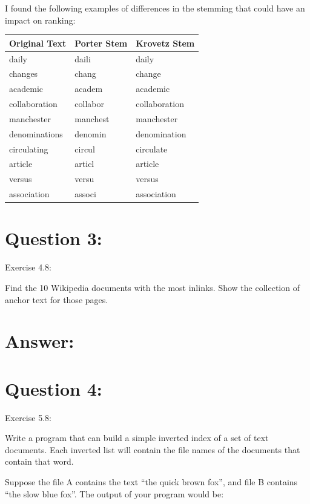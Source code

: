 \documentclass[a4paper, 11pt]{article}
\begin{document}
\pagebreak

I found the following examples of differences in the stemming that could have an impact on ranking:

\begin{longtable}{ |p{3cm}|p{3cm}|p{3cm}| } 
\hline
Original Text & Porter Stem & Krovetz Stem \\
 \hline 
 daily & daili & daily \\
 \hline
  changes & chang & change \\
 \hline
  academic & academ & academic \\
 \hline
  collaboration & collabor & collaboration \\
 \hline
  manchester & manchest & manchester \\
 \hline
  denominations & denomin & denomination \\
 \hline
  circulating & circul & circulate \\
 \hline
  article & articl & article \\
 \hline
  versus & versu & versus \\
 \hline
  association & associ & association \\
 \hline
\end{longtable}








\section*{Question 3:}
Exercise 4.8:

Find the 10 Wikipedia documents with the most inlinks. Show the collection
of anchor text for those pages.

\section*{Answer:}


\section*{Question 4:}
Exercise 5.8: 

Write a program that can build a simple inverted index of a set of text documents. Each inverted list will contain the file names of the documents that contain that word.

Suppose the file A contains the text “the quick brown fox”, and file B contains “the slow blue fox”. The output of your program would be:
\end{document}
